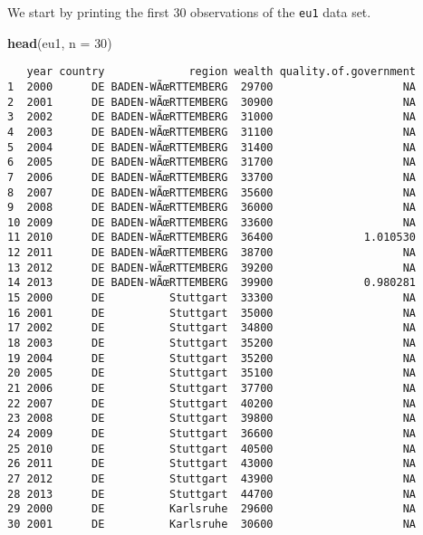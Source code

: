 \documentclass[]{article}
\newenvironment{Shaded}{\begin{snugshade}}{\end{snugshade}}
\newcommand{\DataTypeTok}[1]{\textcolor[rgb]{0.13,0.29,0.53}{#1}}
\newcommand{\DecValTok}[1]{\textcolor[rgb]{0.00,0.00,0.81}{#1}}
\newcommand{\KeywordTok}[1]{\textcolor[rgb]{0.13,0.29,0.53}{\textbf{#1}}}
\newcommand{\NormalTok}[1]{#1}
\begin{document}
We start by printing the first 30 observations of the \texttt{eu1} data set.

\begin{Shaded}
\begin{Highlighting}[]
\KeywordTok{head}\NormalTok{(eu1, }\DataTypeTok{n =} \DecValTok{30}\NormalTok{)}
\end{Highlighting}
\end{Shaded}

\begin{verbatim}
   year country             region wealth quality.of.government
1  2000      DE BADEN-WÃœRTTEMBERG  29700                    NA
2  2001      DE BADEN-WÃœRTTEMBERG  30900                    NA
3  2002      DE BADEN-WÃœRTTEMBERG  31000                    NA
4  2003      DE BADEN-WÃœRTTEMBERG  31100                    NA
5  2004      DE BADEN-WÃœRTTEMBERG  31400                    NA
6  2005      DE BADEN-WÃœRTTEMBERG  31700                    NA
7  2006      DE BADEN-WÃœRTTEMBERG  33700                    NA
8  2007      DE BADEN-WÃœRTTEMBERG  35600                    NA
9  2008      DE BADEN-WÃœRTTEMBERG  36000                    NA
10 2009      DE BADEN-WÃœRTTEMBERG  33600                    NA
11 2010      DE BADEN-WÃœRTTEMBERG  36400              1.010530
12 2011      DE BADEN-WÃœRTTEMBERG  38700                    NA
13 2012      DE BADEN-WÃœRTTEMBERG  39200                    NA
14 2013      DE BADEN-WÃœRTTEMBERG  39900              0.980281
15 2000      DE          Stuttgart  33300                    NA
16 2001      DE          Stuttgart  35000                    NA
17 2002      DE          Stuttgart  34800                    NA
18 2003      DE          Stuttgart  35200                    NA
19 2004      DE          Stuttgart  35200                    NA
20 2005      DE          Stuttgart  35100                    NA
21 2006      DE          Stuttgart  37700                    NA
22 2007      DE          Stuttgart  40200                    NA
23 2008      DE          Stuttgart  39800                    NA
24 2009      DE          Stuttgart  36600                    NA
25 2010      DE          Stuttgart  40500                    NA
26 2011      DE          Stuttgart  43000                    NA
27 2012      DE          Stuttgart  43900                    NA
28 2013      DE          Stuttgart  44700                    NA
29 2000      DE          Karlsruhe  29600                    NA
30 2001      DE          Karlsruhe  30600                    NA
\end{verbatim}
\end{document}
